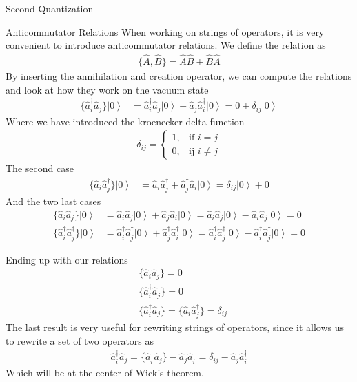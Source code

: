 \documentclass[twoside,english]{uiofysmaster}
\begin{document}
\begin{chapter}{Second Quantization}
	\begin{section}{Anticommutator Relations}
		When working on strings of operators, it is very convenient to introduce anticommutator relations. We define the relation as 
		\begin{align}
			\{ \hat A, \hat B \} = \hat A \hat B + \hat B \hat A	
		\end{align}
		By inserting the annihilation and creation operator, we can compute the relations and look at how they work on the vacuum state 
		\begin{align}
			\{ \hat a_i^\dagger \hat a_j \} \left| 0 \right>  &= \hat a_i^\dagger \hat a_j \left| 0 \right>  + \hat a_j \hat a_i^\dagger \left| 0 \right> = 0 + \delta_{ij} \left|0\right> 
 		\end{align}
 		Where we have introduced the kroenecker-delta function
 		\begin{align}
 			\delta_{ij} = \begin{cases}
 						1, & \text{if } i = j \\
 						0, & \text{ij } i \neq j
 						\end{cases}
 		\end{align}
		The second case
		\begin{align}
			\{ \hat a_i \hat a_j^\dagger \} \left| 0 \right> &= \hat a_i \hat a_j^\dagger + \hat a_j^\dagger \hat a_i \left| 0 \right> = \delta_{ij} \left| 0 \right> + 0
		\end{align}
		And the two last cases
 		\begin{align}
			\{ \hat a_i \hat a_j \} \left| 0 \right> &= \hat a_i \hat a_j \left| 0 \right> + \hat a_j \hat a_i \left| 0 \right> = \hat a_i \hat a_j \left| 0 \right> - \hat a_i \hat a_j \left| 0 \right> = 0\\
			\{ \hat a_i^\dagger \hat a_j^\dagger \} \left| 0 \right> &= \hat a_i^\dagger \hat a_j^\dagger \left| 0 \right> + \hat a_j^\dagger \hat a_i^\dagger \left| 0 \right> = \hat a_i^\dagger \hat a_j^\dagger \left| 0 \right> - \hat a_i^\dagger \hat a_j^\dagger \left| 0 \right> = 0
 		\end{align}

 		Ending up with our relations
 		\begin{align}
 			&\{ \hat a_i \hat a_j \} = 0 \\
 			&\{ \hat a_i^\dagger \hat a_j^\dagger \} = 0 \\
			&\{ \hat a_i^\dagger \hat a_j \} = \{ \hat a_i \hat a_j^\dagger \} = \delta_{ij}
		\end{align}
		The last result is very useful for rewriting strings of operators, since it allows us to rewrite a set of two operators as
		\begin{align}
			\hat a_i^\dagger \hat a_j = \{ \hat a_i^\dagger \hat a_j \} - \hat a_j \hat a_i^\dagger = \delta_{ij} - \hat a_j \hat a_i^\dagger 
			\label{interchange operators}
		\end{align}
		Which will be at the center of Wick's theorem. 
	\end{section}


\end{chapter}
\end{document}
